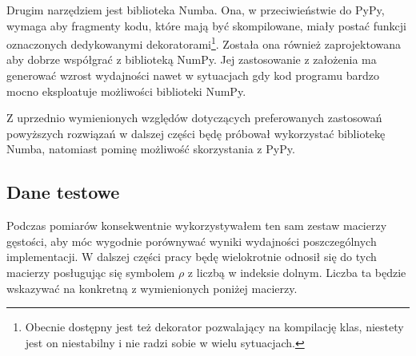 \documentclass[11pt, a4paper]{article}
\begin{document}
\begin{sloppypar}
    Drugim narzędziem jest biblioteka Numba\cite{Numba_Article}\cite{Numba_Doc}. Ona, w
    przeciwieństwie do PyPy, wymaga aby fragmenty kodu, które mają być skompilowane, miały
    postać funkcji oznaczonych dedykowanymi dekoratorami\footnote{Obecnie dostępny jest
    też dekorator pozwalający na kompilację klas, niestety jest on niestabilny i nie radzi
    sobie w wielu sytuacjach.}. Została ona również zaprojektowana aby dobrze współgrać
    z biblioteką NumPy. Jej zastosowanie z założenia ma generować wzrost wydajności nawet
    w sytuacjach gdy kod programu bardzo mocno eksploatuje możliwości biblioteki NumPy.

    Z uprzednio wymienionych względów dotyczących preferowanych zastosowań powyższych rozwiązań
    w dalszej części będę próbował wykorzystać bibliotekę Numba, natomiast pominę
    możliwość skorzystania z PyPy.

    \newpage


    \subsection{Dane testowe}


    Podczas pomiarów konsekwentnie wykorzystywałem ten sam zestaw macierzy gęstości, aby
    móc wygodnie porównywać wyniki wydajności poszczególnych implementacji. W dalszej
    części pracy będę wielokrotnie odnosił się do tych macierzy posługując się symbolem
    $\rho$ z liczbą w indeksie dolnym. Liczba ta będzie wskazywać na konkretną z wymienionych
    poniżej macierzy.


\end{sloppypar}
\end{document}

